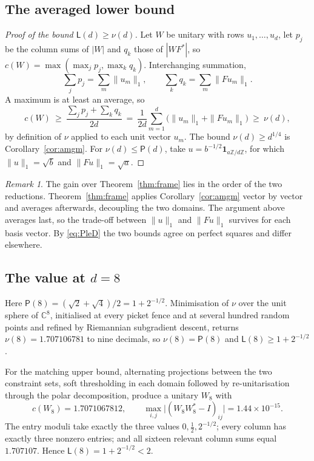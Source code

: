 \documentclass[11pt,reqno]{amsart}
\theoremstyle{plain}
\theoremstyle{definition}
\theoremstyle{remark}
\newtheorem{remark}[theorem]{Remark}
\newcommand{\C}{\mathbb{C}}
\newcommand{\Z}{\mathbb{Z}}
\newcommand{\one}{\mathbf{1}}
\newcommand{\Lb}{\mathsf{L}}
\newcommand{\Pp}{\mathsf{P}}
\begin{document}
\subsection{The averaged lower bound}

\begin{proof}[Proof of the bound $\Lb(d)\ge\nu(d)$]
Let $W$ be unitary with rows $u_1,\ldots,u_d$, let $p_j$ be the column
sums of $|W|$ and $q_k$ those of $|WF^{*}|$, so
$c(W)=\max(\max_jp_j,\max_kq_k)$.  Interchanging summation,
\[
  \sum_jp_j=\sum_m\|u_m\|_1,\qquad \sum_kq_k=\sum_m\|Fu_m\|_1 .
\]
A maximum is at least an average, so
\[
  c(W)\ \ge\ \frac{\sum_jp_j+\sum_kq_k}{2d}
  \ =\ \frac1{2d}\sum_{m=1}^d\bigl(\|u_m\|_1+\|Fu_m\|_1\bigr)
  \ \ge\ \nu(d),
\]
by definition of $\nu$ applied to each unit vector $u_m$.  The bound
$\nu(d)\ge d^{1/4}$ is Corollary~\ref{cor:amgm}.  For
$\nu(d)\le\Pp(d)$, take $u=b^{-1/2}\one_{a\Z/d\Z}$, for which
$\|u\|_1=\sqrt b$ and $\|Fu\|_1=\sqrt a$.
\end{proof}

\begin{remark}
The gain over Theorem~\ref{thm:frame} lies in the order of the two
reductions.  Theorem~\ref{thm:frame} applies Corollary~\ref{cor:amgm}
vector by vector and averages afterwards, decoupling the two domains.
The argument above averages last, so the trade-off between $\|u\|_1$ and
$\|Fu\|_1$ survives for each basis vector.  By \eqref{eq:PleD} the two
bounds agree on perfect squares and differ elsewhere.
\end{remark}

\subsection{The value at \texorpdfstring{$d=8$}{d=8}}\label{sec:d8}

Here $\Pp(8)=(\sqrt2+\sqrt4)/2=1+2^{-1/2}$.  Minimisation of $\nu$ over
the unit sphere of $\C^8$, initialised at every picket fence and at
several hundred random points and refined by Riemannian subgradient
descent, returns $\nu(8)=1.707106781$ to nine decimals, so
$\nu(8)=\Pp(8)$ and $\Lb(8)\ge1+2^{-1/2}$.

For the matching upper bound, alternating projections between the two
constraint sets, soft thresholding in each domain followed by
re-unitarisation through the polar decomposition, produce a unitary
$W_8$ with
\[
  c(W_8)=1.7071067812,
  \qquad
  \max_{i,j}\bigl|(W_8W_8^{*}-I)_{ij}\bigr|=1.44\times10^{-15}.
\]
The entry moduli take exactly the three values $0,\tfrac12,2^{-1/2}$;
every column has exactly three nonzero entries; and all sixteen relevant
column sums equal $1.707107$.  Hence $\Lb(8)=1+2^{-1/2}<2$.
\end{document}
